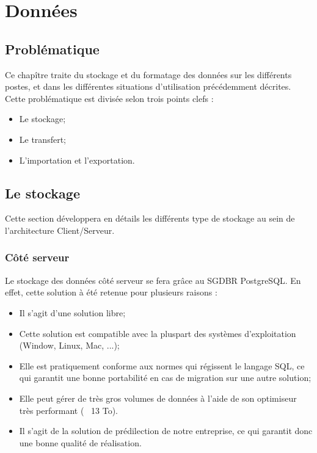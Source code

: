 \section{Données}

% 

\subsection{Problématique}

Ce chapître traite du stockage et du formatage des données sur les différents postes, et dans les différentes situations d'utilisation précédemment décrites.
Cette problématique est divisée selon trois points clefs :
\begin{itemize}
	\item Le stockage;
	\item Le transfert;
	\item L'importation et l'exportation.
\end{itemize}

\subsection{Le stockage}
Cette section développera en détails les différents type de stockage au sein de l'architecture Client/Serveur.

\subsubsection{Côté serveur}
Le stockage des données côté serveur se fera grâce au SGDBR PostgreSQL. En effet, cette solution à été retenue pour plusieurs raisons :
\begin{itemize}
	\item Il s'agit d'une solution libre;
	\item Cette solution est compatible avec la pluspart des systèmes d'exploitation (Window, Linux, Mac, ...);
	\item Elle est pratiquement conforme aux normes qui régissent le langage SQL, ce qui garantit une bonne portabilité en cas de migration sur une autre solution;
	\item Elle peut gérer de très gros volumes de données à l'aide de son optimiseur très performant (~ 13 To).
	\item Il s'agit de la solution de prédilection de notre entreprise, ce qui garantit donc une bonne qualité de réalisation.
\end{itemize}

